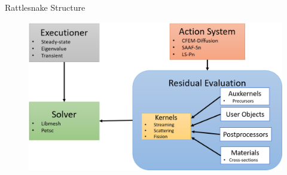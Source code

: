 \documentclass[8pt,xcolor=dvipnames]{beamer}
\begin{document}
\begin{frame}{Rattlesnake Structure}

\begin{figure}
\includegraphics[width=\linewidth,height=\textheight,keepaspectratio]{figures/rattlesnake.png}
\end{figure}

\end{frame}
\end{document}

